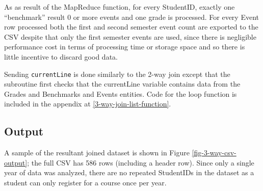 As as result of the MapReduce function, for every StudentID, exactly one ``benchmark'' result 0 or more events and one grade is processed. For every Event row processed both the first and second semester event count are exported to the CSV despite that only the first semester events are used, since there is negligible performance cost in terms of processing time or storage space and so there is little incentive to discard good data.

Sending \texttt{currentLine} is done similarly to the 2-way join except that the subroutine first checks that the currentLine variable contains data from the Grades and Benchmarks and Events entities. Code for the loop function is included in the appendix at \ref{3-way-join-list-function}.



\subsection{Output}
A sample of the resultant joined dataset is shown in Figure \ref{fig-3-way-csv-output}; the full CSV has 586 rows (including a header row). Since only a single year of data was analyzed, there are no repeated StudentIDs in the dataset as a student can only register for a course once per year.
